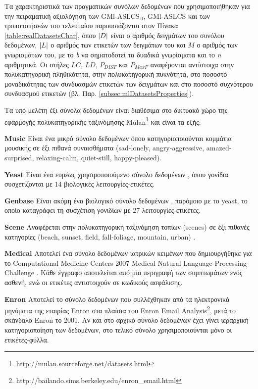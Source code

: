 Τα χαρακτηριστικά των πραγματικών συνόλων δεδομένων που χρησιμοποιήθηκαν για την πειραματική αξιολόγηση των GMl-ASLCS$_{\:0}$, GMl-ASLCS και των τροποποιήσεών του τελευταίου παρουσιάζονται στον Πίνακα \ref{table:realDatasetsChar}, όπου $\lvert D\rvert$ είναι ο αριθμός δειγμάτων του συνόλου δεδομένων, $\lvert L\rvert$ ο αριθμός των ετικετών των δειγμάτων του και $M$ ο αριθμός των γνωρισμάτων του, με το \emph{b} να σηματοδοτεί τα δυαδικά γνωρίσματα και το \emph{n} αριθμητικά. Οι στήλες $LC$, $LD$, $P_{DIST}$ και $P_{MaxF}$ αναφέρονται αντίστοιχα στην πολυκατηγορική πληθικότητα, στην πολυκατηγορική πυκνότητα, στο ποσοστό μοναδικότητας των συνδυασμών ετικετών των δειγμάτων και στο ποσοστό συχνότερου συνδυασμού ετικετών (βλ. Παρ. \ref{subsec:mlDatasetsProperties}).

Τα υπό μελέτη έξι σύνολα δεδομένων είναι διαθέσιμα στο δικτυακό χώρο της εφαρμογής πολυκατηγορικής ταξινόμησης Mulan\footnote{http://mulan.sourceforge.net/datasets.html} και είναι τα εξής:

\begin{description}
\item \textbf{Music} Είναι ένα μικρό σύνολο δεδομένων \cite{trohidis2008multilabel} όπου κατηγοριοποιούνται κομμάτια μουσικής σε έξι πιθανά συναισθήματα (sad-lonely, angry-aggressive, amazed-surprised, relaxing-calm, quiet-still, happy-pleased).
\item \textbf{Yeast} Είναι ένα ευρέως χρησιμοποιούμενο σύνολο δεδομένων \cite{elisseeff2002kernel}, όπου γονίδια συσχετίζονται με $14$ βιολογικές λειτουργίες-ετικέτες.
\item \textbf{Genbase} Είναι ακόμη ένα βιολογικό σύνολο δεδομένων \cite{diplaris2005protein}, παρόμοιο με το yeast, το οποίο καταγράφει τη συσχέτιση γονιδίων με 27 λειτουργίες-ετικέτες.
\item \textbf{Scene} Αναφέρεται στην πολυκατηγορική ταξινόμηση τοπίων (scenes) σε έξι πιθανές κατηγορίες (beach, sunset, field, fall-foliage, mountain, urban) \cite{boutell2004learning}.
\item \textbf{Medical} Αποτελεί ένα σύνολο δεδομένων ιατρικών κειμένων που δημιουργήθηκε για το Computational Medicine Centers 2007 Medical Natural Language Processing Challenge \cite{pestian2007shared}. Κάθε έγγραφο αποτελείται από μία περιγραφή των συμπτωμάτων ενός ασθενή, ενώ οι ετικέτες αντιστοιχούν σε κωδικούς ασφάλισης.
\item \textbf{Enron} Αποτελεί το σύνολο δεδομένων που συλλέχθηκαν από τα ηλεκτρονικά μηνύματα της εταιρίας Enron στα πλαίσια του Enron Email Analysis\footnote{http://bailando.sims.berkeley.edu/enron\_email.html}, μετά το σκάνδαλο Enron το 2001. Αν και στο αρχικό σύνολο δεδομένων έχει γίνει ιεραρχική κατηγοριοποίηση των δεδομένων, στο τελικό σύνολο χρησιμοποιούνται μόνο οι ετικέτες-φύλλα.
\end{description}






